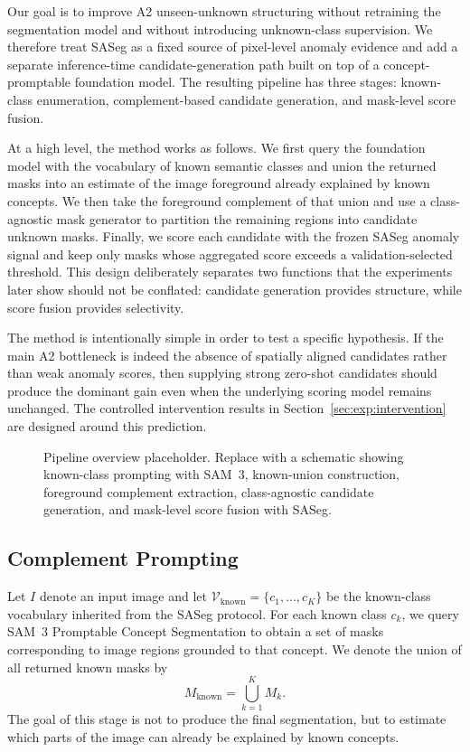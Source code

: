 \documentclass[a4paper,fleqn]{cas-dc}
\newcommand{\samthree}{SAM~3}
\begin{document}
Our goal is to improve A2 unseen-unknown structuring without retraining the segmentation model and without introducing unknown-class supervision. We therefore treat SASeg as a fixed source of pixel-level anomaly evidence and add a separate inference-time candidate-generation path built on top of a concept-promptable foundation model. The resulting pipeline has three stages: known-class enumeration, complement-based candidate generation, and mask-level score fusion.

At a high level, the method works as follows. We first query the foundation model with the vocabulary of known semantic classes and union the returned masks into an estimate of the image foreground already explained by known concepts. We then take the foreground complement of that union and use a class-agnostic mask generator to partition the remaining regions into candidate unknown masks. Finally, we score each candidate with the frozen SASeg anomaly signal and keep only masks whose aggregated score exceeds a validation-selected threshold. This design deliberately separates two functions that the experiments later show should not be conflated: candidate generation provides structure, while score fusion provides selectivity.

The method is intentionally simple in order to test a specific hypothesis. If the main A2 bottleneck is indeed the absence of spatially aligned candidates rather than weak anomaly scores, then supplying strong zero-shot candidates should produce the dominant gain even when the underlying scoring model remains unchanged. The controlled intervention results in Section~\ref{sec:exp:intervention} are designed around this prediction.

\begin{figure}[!t]
  \centering
  \fbox{\rule{0pt}{2.1in}\rule{0.95\textwidth}{0pt}}
  \caption{Pipeline overview placeholder. Replace with a schematic showing known-class prompting with \samthree{}, known-union construction, foreground complement extraction, class-agnostic candidate generation, and mask-level score fusion with SASeg.}
  \label{fig:pipeline}
\end{figure}

\subsection{Complement Prompting}
\label{sec:method:complement}

Let $I$ denote an input image and let $\mathcal{V}_{\text{known}} = \{c_1, \dots, c_K\}$ be the known-class vocabulary inherited from the SASeg protocol. For each known class $c_k$, we query \samthree{} Promptable Concept Segmentation to obtain a set of masks corresponding to image regions grounded to that concept. We denote the union of all returned known masks by
\begin{equation}
M_{\text{known}} = \bigcup_{k=1}^{K} M_k.
\end{equation}
The goal of this stage is not to produce the final segmentation, but to estimate which parts of the image can already be explained by known concepts.
\end{document}

